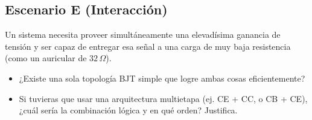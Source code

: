 \documentclass[11pt, a4paper]{article}
\begin{document}
\subsection*{Escenario E (Interacción)}
Un sistema necesita proveer simultáneamente una elevadísima ganancia de tensión y ser capaz de entregar esa señal a una carga de muy baja resistencia (como un auricular de $32\,\Omega$).
\begin{itemize}
    \item ¿Existe una sola topología BJT simple que logre ambas cosas eficientemente?
    \item Si tuvieras que usar una arquitectura multietapa (ej. CE + CC, o CB + CE), ¿cuál sería la combinación lógica y en qué orden? Justifica.
\end{itemize}
\end{document}
